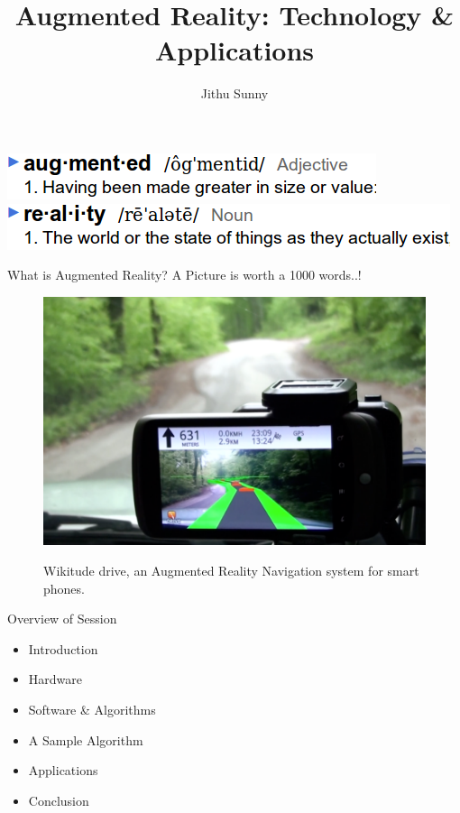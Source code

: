 \documentclass{beamer}
\title{Augmented Reality: Technology \& Applications}
\author{Jithu Sunny}
\begin{document}
\begin{frame}
	\maketitle
	\includegraphics[scale=.5]{augmented.png}\\
	\includegraphics[scale=.5]{reality.png}
\end{frame}


\begin{frame}{What is Augmented Reality?}
	{\centering A Picture is worth a 1000 words..!}
	\begin{figure}
		\includegraphics[scale=.25]{wikitude.png}\\
		\caption{Wikitude drive, an Augmented Reality Navigation system for smart phones.}
	\end{figure}
\end{frame}


\begin{frame}{Overview of Session}
	\begin{itemize}
		\item Introduction
		\item Hardware
		\item Software \& Algorithms
		\item A Sample Algorithm
		\item Applications
		\item Conclusion
	\end{itemize}
\end{frame}
\end{document}
